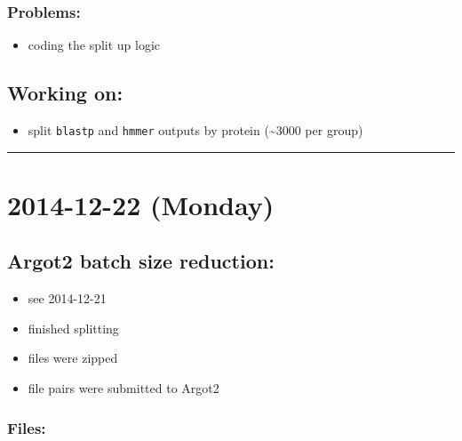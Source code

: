 \documentclass[letterpaper]{scrartcl}
\begin{document}
\subsubsection{Problems:}\label{problems-1}

\begin{itemize}
\itemsep1pt\parskip0pt
\item
  coding the split up logic
\end{itemize}

\subsection{Working on:}\label{working-on}

\begin{itemize}
\itemsep1pt\parskip0pt
\item
  split \texttt{blastp} and \texttt{hmmer} outputs by protein
  (\textasciitilde{}3000 per group)
\end{itemize}

\begin{center}\rule{0.5\linewidth}{\linethickness}\end{center}

\section{2014-12-22 (Monday)}\label{monday}

\subsection{Argot2 batch size
reduction:}\label{argot2-batch-size-reduction-2}

\begin{itemize}
\itemsep1pt\parskip0pt
\item
  see 2014-12-21
\item
  finished splitting
\item
  files were zipped
\item
  file pairs were submitted to Argot2
\end{itemize}

\subsubsection{Files:}\label{files}
\end{document}
